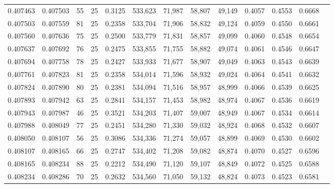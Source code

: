 \begin{tabular}{rrrrrrrrrrrrr}
0.407463 & 0.407503 &    55 &  25 &                                     0.3125 & 533,623 &  71,987 &  58,807 &  49,149 & 0.4057 & 0.4553 & 0.6668 \\
0.407503 & 0.407559 &    81 &  25 &                                     0.2358 & 533,704 &  71,906 &  58,832 &  49,124 & 0.4059 & 0.4550 & 0.6661 \\
0.407560 & 0.407636 &    75 &  25 &                                     0.2500 & 533,779 &  71,831 &  58,857 &  49,099 & 0.4060 & 0.4548 & 0.6654 \\
0.407637 & 0.407692 &    76 &  25 &                                     0.2475 & 533,855 &  71,755 &  58,882 &  49,074 & 0.4061 & 0.4546 & 0.6647 \\
0.407694 & 0.407758 &    78 &  25 &                                     0.2427 & 533,933 &  71,677 &  58,907 &  49,049 & 0.4063 & 0.4543 & 0.6639 \\
0.407761 & 0.407823 &    81 &  25 &                                     0.2358 & 534,014 &  71,596 &  58,932 &  49,024 & 0.4064 & 0.4541 & 0.6632 \\
0.407824 & 0.407890 &    80 &  25 &                                     0.2381 & 534,094 &  71,516 &  58,957 &  48,999 & 0.4066 & 0.4539 & 0.6625 \\
0.407893 & 0.407942 &    63 &  25 &                                     0.2841 & 534,157 &  71,453 &  58,982 &  48,974 & 0.4067 & 0.4536 & 0.6619 \\
0.407943 & 0.407987 &    46 &  25 &                                     0.3521 & 534,203 &  71,407 &  59,007 &  48,949 & 0.4067 & 0.4534 & 0.6614 \\
0.407988 & 0.408049 &    77 &  25 &                                     0.2451 & 534,280 &  71,330 &  59,032 &  48,924 & 0.4068 & 0.4532 & 0.6607 \\
0.408050 & 0.408107 &    56 &  25 &                                     0.3086 & 534,336 &  71,274 &  59,057 &  48,899 & 0.4069 & 0.4530 & 0.6602 \\
0.408107 & 0.408165 &    66 &  25 &                                     0.2747 & 534,402 &  71,208 &  59,082 &  48,874 & 0.4070 & 0.4527 & 0.6596 \\
0.408165 & 0.408234 &    88 &  25 &                                     0.2212 & 534,490 &  71,120 &  59,107 &  48,849 & 0.4072 & 0.4525 & 0.6588 \\
0.408234 & 0.408286 &    70 &  25 &                                     0.2632 & 534,560 &  71,050 &  59,132 &  48,824 & 0.4073 & 0.4523 & 0.6581 \\

\end{tabular}
